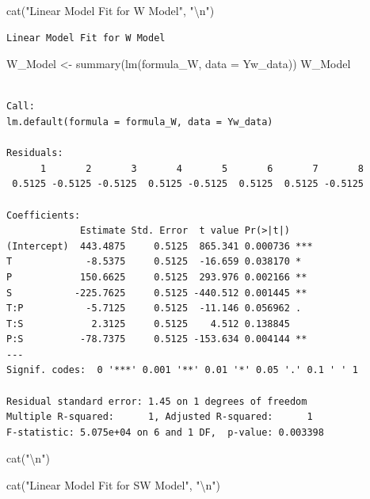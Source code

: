 \documentclass[
  letterpaper,
  DIV=11,
  numbers=noendperiod]{scrartcl}
\newenvironment{Shaded}{\begin{snugshade}}{\end{snugshade}}
\newcommand{\AttributeTok}[1]{\textcolor[rgb]{0.40,0.45,0.13}{#1}}
\newcommand{\FunctionTok}[1]{\textcolor[rgb]{0.28,0.35,0.67}{#1}}
\newcommand{\NormalTok}[1]{\textcolor[rgb]{0.00,0.23,0.31}{#1}}
\newcommand{\OtherTok}[1]{\textcolor[rgb]{0.00,0.23,0.31}{#1}}
\newcommand{\SpecialCharTok}[1]{\textcolor[rgb]{0.37,0.37,0.37}{#1}}
\newcommand{\StringTok}[1]{\textcolor[rgb]{0.13,0.47,0.30}{#1}}
\begin{document}
\begin{Shaded}
\begin{Highlighting}[]
\FunctionTok{cat}\NormalTok{(}\StringTok{"Linear Model Fit for W Model"}\NormalTok{, }\StringTok{"}\SpecialCharTok{\textbackslash{}n}\StringTok{"}\NormalTok{)}
\end{Highlighting}
\end{Shaded}

\begin{verbatim}
Linear Model Fit for W Model 
\end{verbatim}

\begin{Shaded}
\begin{Highlighting}[]
\NormalTok{W\_Model }\OtherTok{\textless{}{-}} \FunctionTok{summary}\NormalTok{(}\FunctionTok{lm}\NormalTok{(formula\_W, }\AttributeTok{data =}\NormalTok{ Yw\_data))}
\NormalTok{W\_Model}
\end{Highlighting}
\end{Shaded}

\begin{verbatim}

Call:
lm.default(formula = formula_W, data = Yw_data)

Residuals:
      1       2       3       4       5       6       7       8 
 0.5125 -0.5125 -0.5125  0.5125 -0.5125  0.5125  0.5125 -0.5125 

Coefficients:
             Estimate Std. Error  t value Pr(>|t|)    
(Intercept)  443.4875     0.5125  865.341 0.000736 ***
T             -8.5375     0.5125  -16.659 0.038170 *  
P            150.6625     0.5125  293.976 0.002166 ** 
S           -225.7625     0.5125 -440.512 0.001445 ** 
T:P           -5.7125     0.5125  -11.146 0.056962 .  
T:S            2.3125     0.5125    4.512 0.138845    
P:S          -78.7375     0.5125 -153.634 0.004144 ** 
---
Signif. codes:  0 '***' 0.001 '**' 0.01 '*' 0.05 '.' 0.1 ' ' 1

Residual standard error: 1.45 on 1 degrees of freedom
Multiple R-squared:      1, Adjusted R-squared:      1 
F-statistic: 5.075e+04 on 6 and 1 DF,  p-value: 0.003398
\end{verbatim}

\begin{Shaded}
\begin{Highlighting}[]
\FunctionTok{cat}\NormalTok{(}\StringTok{"}\SpecialCharTok{\textbackslash{}n}\StringTok{"}\NormalTok{)}
\end{Highlighting}
\end{Shaded}

\begin{Shaded}
\begin{Highlighting}[]
\FunctionTok{cat}\NormalTok{(}\StringTok{"Linear Model Fit for SW Model"}\NormalTok{, }\StringTok{"}\SpecialCharTok{\textbackslash{}n}\StringTok{"}\NormalTok{)}
\end{Highlighting}
\end{Shaded}
\end{document}
